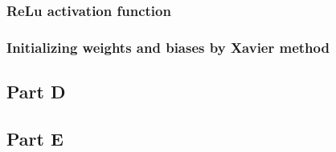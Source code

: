 \subsubsection{ReLu activation function}
\label{chap:ReLu activation function}

\subsubsection{Initializing weights and biases by Xavier method}
\label{chap:Initializing weights and biases by Xavier method}

\subsection{Part D}
\label{chap:Part D}

\subsection{Part E}
\label{chap:Part E}

